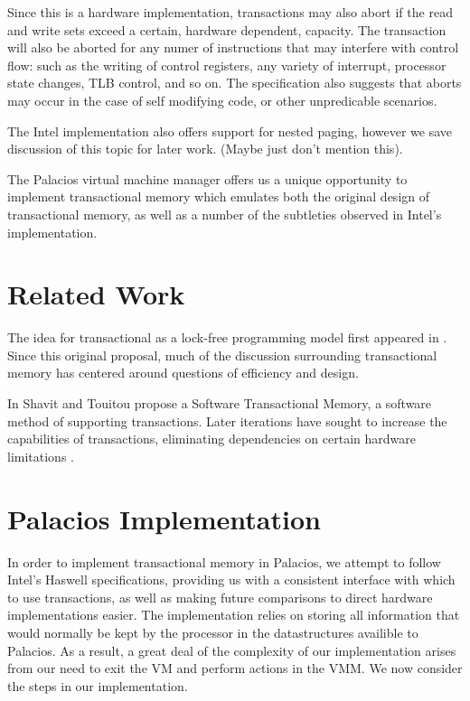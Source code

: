 \documentclass{acm_proc_article-sp}
\begin{document}
Since this is a hardware implementation, transactions may also abort if the 
read and write sets exceed a certain, hardware dependent, capacity. The 
transaction will also be aborted for any numer of instructions that may 
interfere with control flow: such as the writing of control registers, any 
variety of interrupt, processor state changes, TLB control, and so on. The 
specification also suggests that aborts may occur in the case of self modifying
code, or other unpredicable scenarios.

The Intel implementation also offers support for nested paging, however we
save discussion of this topic for later work. (Maybe just don't mention this). 

The Palacios virtual machine manager offers us a unique opportunity to
implement transactional memory which emulates both the original design of
transactional memory, as well as a number of the subtleties observed in 
Intel's implementation.

\section{Related Work}

The idea for transactional as a lock-free programming model first appeared in
 \cite{Herlihy:1993:TMA:173682.165164}. Since this original proposal, much of
the discussion surrounding transactional memory has centered around questions 
of efficiency and design.

In \cite{Shavit:1995:STM:224964.224987} Shavit and Touitou propose a Software
Transactional Memory, a software method of supporting transactions. Later 
iterations have sought to increase the capabilities of transactions, 
eliminating dependencies on certain hardware limitations  
\cite{Ananian:2006:UTM:1116644.1116670, Hammond:2004:TMC:1028176.1006711,
Rajwar:2005:VTM:1080695.1070011}. 

\section{Palacios Implementation}
In order to implement transactional memory in Palacios, we attempt to follow 
Intel's Haswell specifications, providing us with a consistent interface with which
to use transactions, as well as making future comparisons to direct hardware
implementations easier. The implementation relies on storing all information
that would normally be kept by the processor in the datastructures availible
to Palacios. As a result, a great deal of the complexity of our implementation
arises from our need to exit the VM and perform actions in the VMM. We now
consider the steps in our implementation.
\end{document}

